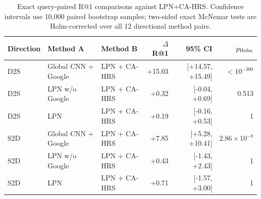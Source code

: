 \begin{table}[!t]
\centering
\small
\caption{Exact query-paired R@1 comparisons against LPN+CA-HRS. Confidence intervals use 10,000 paired bootstrap samples; two-sided exact McNemar tests are Holm-corrected over all 12 directional method pairs.}
\label{tab:formal-baseline-exact-significance}
\begin{tabular}{lllrrr}
\toprule
Direction & Method A & Method B & $\Delta$R@1 & 95\% CI & $p_{\rm Holm}$ \\
\midrule
D2S & Global CNN + Google & LPN + CA-HRS & +15.03 & [+14.57, +15.49] & $<10^{-300}$ \\
D2S & LPN w/o Google & LPN + CA-HRS & +0.32 & [-0.04, +0.69] & 0.513 \\
D2S & LPN & LPN + CA-HRS & +0.19 & [-0.16, +0.53] & 1 \\
S2D & Global CNN + Google & LPN + CA-HRS & +7.85 & [+5.28, +10.41] & $2.86\times10^{-8}$ \\
S2D & LPN w/o Google & LPN + CA-HRS & +0.43 & [-1.43, +2.43] & 1 \\
S2D & LPN & LPN + CA-HRS & +0.71 & [-1.57, +3.00] & 1 \\
\bottomrule
\end{tabular}
\end{table}
